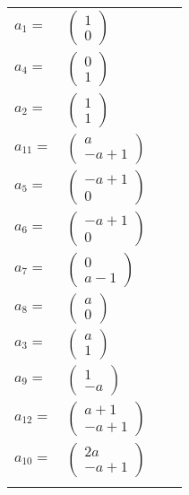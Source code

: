\documentclass[1p]{elsarticle_modified}
\theoremstyle{definition}
\begin{document}
\begin{tabular}{m{7pt} m{180pt} m{7pt} m{180pt} }
\flushright $a_{1}=$&$\begin{pmatrix}1\\0\end{pmatrix}$ \\
\flushright $a_{4}=$&$\begin{pmatrix}0\\1\end{pmatrix}$ \\
\flushright $a_{2}=$&$\begin{pmatrix}1\\1\end{pmatrix}$ \\
\flushright $a_{11}=$&$\begin{pmatrix}a\\- a+1\end{pmatrix}$ \\
\flushright $a_{5}=$&$\begin{pmatrix}- a+1\\0\end{pmatrix}$ \\
\flushright $a_{6}=$&$\begin{pmatrix}- a+1\\0\end{pmatrix}$ \\
\flushright $a_{7}=$&$\begin{pmatrix}0\\a-1\end{pmatrix}$ \\
\flushright $a_{8}=$&$\begin{pmatrix}a\\0\end{pmatrix}$ \\
\flushright $a_{3}=$&$\begin{pmatrix}a\\1\end{pmatrix}$ \\
\flushright $a_{9}=$&$\begin{pmatrix}1\\- a\end{pmatrix}$ \\
\flushright $a_{12}=$&$\begin{pmatrix}a+1\\- a+1\end{pmatrix}$ \\
\flushright $a_{10}=$&$\begin{pmatrix}2 a\\- a+1\end{pmatrix}$\\&\end{tabular}
\end{document}

